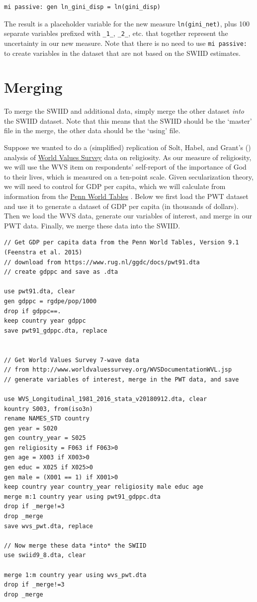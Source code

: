 \documentclass[11pt]{article}
\begin{document}
\begin{verbatim}
mi passive: gen ln_gini_disp = ln(gini_disp)
\end{verbatim}

The result is a placeholder variable for the new measure \verb+ln(gini_net)+, plus 100 separate variables prefixed with \verb+_1_+, \verb+_2_+, etc. that together represent the uncertainty in our new measure.  Note that there is no need to use \verb+mi passive:+ to create variables in the dataset that are not based on the SWIID estimates.

\section{Merging}
To merge the SWIID and additional data, simply merge the other dataset \emph{into} the SWIID dataset.  Note that this means that the SWIID should be the `master' file in the merge, the other data should be the `using' file. 

Suppose we wanted to do a (simplified) replication of Solt, Habel, and Grant's (\citeyear{Solt2011a}) analysis of \href{http://worldvaluessurvey.org}{World Values Survey} data on religiosity.  As our measure of religiosity, we will use the WVS item on respondents' self-report of the importance of God to their lives, which is measured on a ten-point scale.  Given secularization theory, we will need to control for GDP per capita, which we will calculate from information from the \href{www.ggdc.net/pwt}{Penn World Tables} \citep{Feenstra2015}.  Below we first load the PWT dataset and use it to generate a dataset of GDP per capita (in thousands of dollars).  Then we load the WVS data, generate our variables of interest, and merge in our PWT data.  Finally, we merge these data into the SWIID.

\begin{verbatim}
// Get GDP per capita data from the Penn World Tables, Version 9.1 (Feenstra et al. 2015)
// download from https://www.rug.nl/ggdc/docs/pwt91.dta
// create gdppc and save as .dta

use pwt91.dta, clear
gen gdppc = rgdpe/pop/1000
drop if gdppc==.
keep country year gdppc
save pwt91_gdppc.dta, replace


// Get World Values Survey 7-wave data 
// from http://www.worldvaluessurvey.org/WVSDocumentationWVL.jsp
// generate variables of interest, merge in the PWT data, and save

use WVS_Longitudinal_1981_2016_stata_v20180912.dta, clear
kountry S003, from(iso3n)
rename NAMES_STD country
gen year = S020
gen country_year = S025 
gen religiosity = F063 if F063>0
gen age = X003 if X003>0
gen educ = X025 if X025>0
gen male = (X001 == 1) if X001>0
keep country year country_year religiosity male educ age
merge m:1 country year using pwt91_gdppc.dta
drop if _merge!=3
drop _merge
save wvs_pwt.dta, replace

// Now merge these data *into* the SWIID
use swiid9_8.dta, clear

merge 1:m country year using wvs_pwt.dta
drop if _merge!=3
drop _merge

\end{verbatim}
\end{document}

